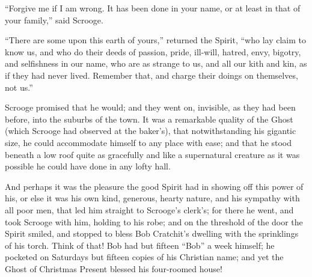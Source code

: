 \documentclass[paper=5.5in:8.5in,BCOR=15mm,twoside,DIV=15,headinclude=off,12pt,chapterprefix=off,openany,headings=huge]{scrbook} %
\begin{document}
\enquote{Forgive me if I am wrong. It has been done in your name, or at least in that of your family,} said Scrooge.

\enquote{There are some upon this earth of yours,} returned the Spirit, \enquote{who lay claim to know us, and who do their deeds of passion, pride, ill-will, hatred, envy, bigotry, and selfishness in our name, who are as strange to us, and all our kith and kin, as if they had never lived. Remember that, and charge their doings on themselves, not us.}


Scrooge promised that he would; and they went on, invisible, as they had been before, into the suburbs of the town. It was a remarkable quality of the Ghost (which Scrooge had observed at the baker's), that notwithstanding his gigantic size, he could accommodate himself to any place with ease; and that he stood beneath a low roof quite as gracefully and like a supernatural creature as it was possible he could have done in any lofty hall.

And perhaps it was the pleasure the good Spirit had in showing off this power of his, or else it was his own kind, generous, hearty nature, and his sympathy with all poor men, that led him straight to Scrooge's clerk's; for there he went, and took Scrooge with him, holding to his robe; and on the threshold of the door the Spirit smiled, and stopped to bless Bob Cratchit's dwelling with the sprinklings of his torch. Think of that! Bob had but fifteen \enquote{Bob} a week himself; he pocketed on Saturdays but fifteen copies of his Christian name; and yet the Ghost of Christmas Present blessed his four-roomed house!
\end{document}
